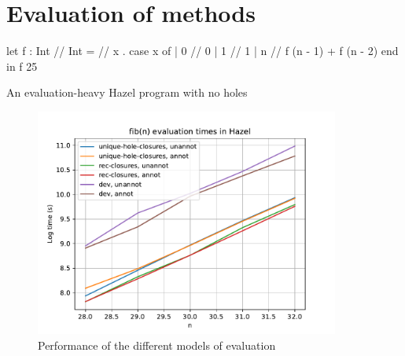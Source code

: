\chapter{Evaluation of methods}
\label{sec:evaluation}

\begin{listing}
\begin{hminted}
let f : Int /\rar/ Int =
  /\lbd/ x . {
    case x of
    | 0 /\Rar/ 0
    | 1 /\Rar/ 1
    | n /\Rar/ f (n - 1) + f (n - 2)
    end
  }
in f 25  
\end{hminted}
\caption{An evaluation-heavy Hazel program with no holes}
\end{listing}

\begin{figure}
  \centering
  \includegraphics[width=10cm]{img/subst_evalenv_fib_perf.pdf}
  \caption{Performance of the different models of evaluation}
  \label{fig:perf_evaluation_models}
\end{figure}





